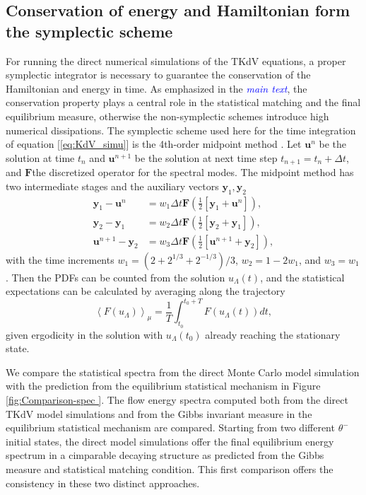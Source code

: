 \documentclass[9pt,twoside,lineno]{pnas-new}
\theoremstyle{plain}
\theoremstyle{plain}
\begin{document}
\subsection{Conservation of energy and Hamiltonian form the symplectic scheme}

For running the direct numerical simulations of the TKdV equations,
a proper symplectic integrator is necessary to guarantee the conservation
of the Hamiltonian and energy in time. As emphasized in the \textcolor{blue}{\emph{main
text}}, the conservation property plays a central role in the statistical
matching and the final equilibrium measure, otherwise the non-symplectic
schemes introduce high numerical dissipations. The symplectic scheme
used here for the time integration of equation [\ref{eq:KdV_simu}]
is the 4th-order midpoint method \cite{mclachlan1993symplectic}.
Let $\mathbf{u}^{n}$ be the solution at time $t_{n}$ and $\mathbf{u}^{n+1}$
be the solution at next time step $t_{n+1}=t_{n}+\Delta t$, and $\mathbf{F}$the
discretized operator for the spectral modes. The midpoint method has
two intermediate stages and the auxiliary vectors $\mathbf{y}_{1},\mathbf{y}_{2}$
\[
\begin{aligned}\mathbf{y}_{1}-\mathbf{u}^{n} & =w_{1}\Delta t\mathbf{F}\left(\frac{1}{2}\left[\mathbf{y}_{1}+\mathbf{u}^{n}\right]\right),\\
\mathbf{y}_{2}-\mathbf{y}_{1} & =w_{2}\Delta t\mathbf{F}\left(\frac{1}{2}\left[\mathbf{y}_{2}+\mathbf{y}_{1}\right]\right),\\
\mathbf{u}^{n+1}-\mathbf{y}_{2} & =w_{3}\Delta t\mathbf{F}\left(\frac{1}{2}\left[\mathbf{u}^{n+1}+\mathbf{y}_{2}\right]\right),
\end{aligned}
\]
with the time increments $w_{1}=\left(2+2^{1/3}+2^{-1/3}\right)/3$,
$w_{2}=1-2w_{1}$, and $w_{3}=w_{1}$. Then the PDFs can be counted
from the solution $u_{\Lambda}\left(t\right)$, and the statistical
expectations can be calculated by averaging along the trajectory
\[
\left\langle F\left(u_{\Lambda}\right)\right\rangle _{\mu}=\frac{1}{T}\int_{t_{0}}^{t_{0}+T}F\left(u_{\Lambda}\left(t\right)\right)dt,
\]
given ergodicity in the solution with $u_{\Lambda}\left(t_{0}\right)$
already reaching the stationary state.

We compare the statistical spectra from the direct Monte Carlo model
simulation with the prediction from the equilibrium statistical mechanism
in Figure \ref{fig:Comparison-spec }. The flow energy spectra computed
both from the direct TKdV model simulations and from the Gibbs invariant
measure in the equilibrium statistical mechanism are compared. Starting
from two different $\theta^{-}$ initial states, the direct model
simulations offer the final equilibrium energy spectrum in a cimparable
decaying structure as predicted from the Gibbs measure and statistical
matching condition. This first comparison offers the consistency in
these two distinct approaches.
\end{document}
